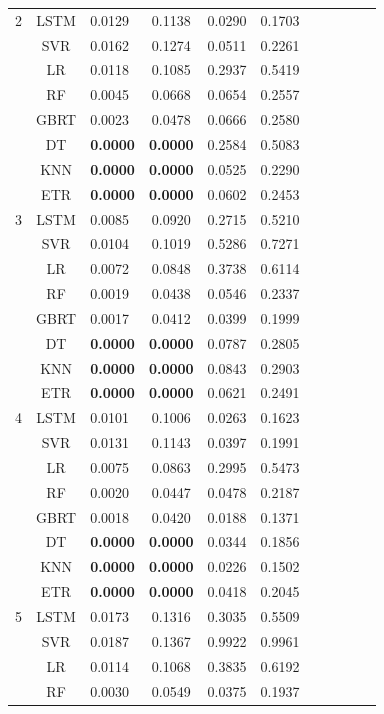 {\begin{longtable}{cclcccccccc}
  2 & LSTM & 0.0129 & 0.1138 & 0.0290 & 0.1703  \\
   & SVR & 0.0162 & 0.1274 & 0.0511 & 0.2261 \\
   & LR & 0.0118 & 0.1085 & 0.2937 & 0.5419\\
   & RF & 0.0045 & 0.0668 & 0.0654 & 0.2557 \\
   & GBRT & 0.0023 & 0.0478 & 0.0666 & 0.2580 \\
   & DT & \textbf{0.0000} & \textbf{0.0000} & 0.2584 & 0.5083 \\
   & KNN & \textbf{0.0000} & \textbf{0.0000} & 0.0525 & 0.2290 \\
   & ETR & \textbf{0.0000} & \textbf{0.0000} & 0.0602 & 0.2453 \\
  \hline
  3 & LSTM & 0.0085 & 0.0920 & 0.2715 & 0.5210  \\
   & SVR & 0.0104 & 0.1019 & 0.5286 & 0.7271 \\
   & LR & 0.0072 & 0.0848 & 0.3738 & 0.6114 \\
   & RF & 0.0019 & 0.0438 & 0.0546 & 0.2337 \\
   & GBRT & 0.0017 & 0.0412 & 0.0399 & 0.1999 \\
   & DT & \textbf{0.0000} & \textbf{0.0000} & 0.0787 & 0.2805 \\
   & KNN & \textbf{0.0000} & \textbf{0.0000} & 0.0843 & 0.2903 \\
   & ETR & \textbf{0.0000} & \textbf{0.0000} & 0.0621 & 0.2491 \\
  \hline
  4 & LSTM & 0.0101 & 0.1006 & 0.0263 & 0.1623 \\
   & SVR & 0.0131 & 0.1143 & 0.0397 & 0.1991  \\
   & LR & 0.0075 & 0.0863 & 0.2995 & 0.5473  \\
   & RF & 0.0020 & 0.0447 & 0.0478 & 0.2187  \\
   & GBRT & 0.0018 & 0.0420 & 0.0188 & 0.1371  \\
   & DT & \textbf{0.0000} & \textbf{0.0000} & 0.0344 & 0.1856 \\
   & KNN & \textbf{0.0000} & \textbf{0.0000} & 0.0226 & 0.1502 \\
   & ETR & \textbf{0.0000} & \textbf{0.0000} & 0.0418 & 0.2045 \\
  \hline
  5 & LSTM & 0.0173 & 0.1316 & 0.3035 & 0.5509 \\
   & SVR & 0.0187 & 0.1367 & 0.9922 & 0.9961 \\
   & LR & 0.0114 & 0.1068 & 0.3835 & 0.6192 \\
   & RF & 0.0030 & 0.0549 & 0.0375 & 0.1937 \\

\end{longtable}}
